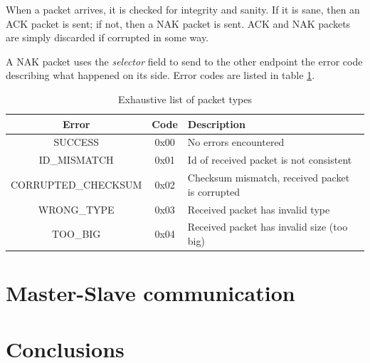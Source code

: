 \documentclass[binding=0.6cm,Lau]{sapthesis}
\begin{document}
When a packet arrives, it is checked for integrity and sanity. If it is sane,
then an ACK packet is sent; if not, then a NAK packet is sent.
ACK and NAK packets are simply discarded if corrupted in some way.

A NAK packet uses the \emph{selector} field to send to the other endpoint the
error code describing what happened on its side. Error codes are listed in
table \ref{tab:packet-error-codes}.

\begin{table}[bh]
  \begin{tabularx}{\textwidth}{c c X}
    \toprule
    Error & Code & Description \\
    \midrule
    SUCCESS             & 0x00 & No errors encountered \\
    ID\_MISMATCH        & 0x01 & Id of received packet is not consistent \\
    CORRUPTED\_CHECKSUM & 0x02 & Checksum mismatch, received packet is corrupted \\
    WRONG\_TYPE         & 0x03 & Received packet has invalid type \\
    TOO\_BIG            & 0x04 & Received packet has invalid size (too big) \\
    \bottomrule
  \end{tabularx}
  \caption{Exhaustive list of packet types}
  \label{tab:packet-error-codes}
\end{table}


\chapter{Master-Slave communication}
\label{ch:master-slave-comm}

\chapter{Conclusions}
\label{ch:conclusions}


\backmatter
\cleardoublepage
{} %



\end{document}
